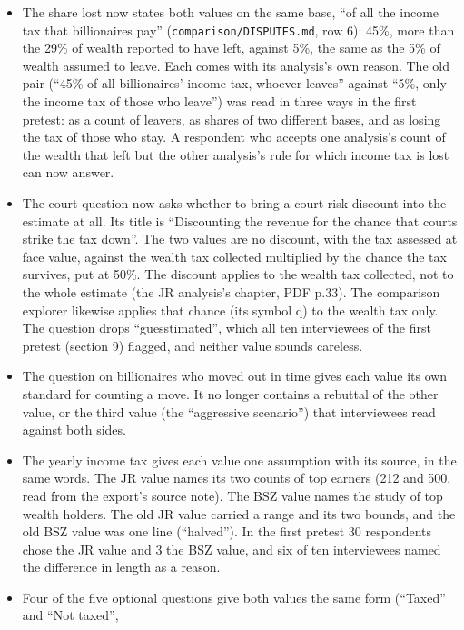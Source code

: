 \begin{itemize}
\tightlist
\item
  The share lost now states both values on the same base, ``of all the income tax that
  billionaires pay'' (\texttt{comparison/DISPUTES.md}, row 6): 45\%, more than the 29\% of wealth reported
  to have left, against 5\%, the same as the 5\% of wealth assumed to leave. Each comes with its
  analysis's own reason. The old pair (``45\% of
  all billionaires' income tax, whoever leaves'' against ``5\%, only the income tax of those who
  leave'') was read in three ways in the first pretest: as a count of leavers, as shares of two different
  bases, and as losing the tax of those who stay. A respondent who accepts one analysis's count
  of the wealth that left but the other analysis's rule for which income tax is lost can now
  answer.
\item
  The court question now asks whether to bring a court-risk discount into the estimate at all.
  Its title is ``Discounting the revenue for the chance that courts strike the tax down''. The two
  values are no discount, with the tax assessed at face value, against the wealth tax collected
  multiplied by the chance the tax survives, put at 50\%. The discount applies to the wealth tax
  collected, not to the whole estimate (the JR analysis's chapter, PDF p.33). The comparison
  explorer likewise applies that chance (its symbol q) to the wealth tax only. The question drops
  ``guesstimated'', which all ten interviewees of the first pretest (section 9) flagged, and neither
  value sounds careless.
\item
  The question on billionaires who moved out in time gives each value its own standard for
  counting a move. It no longer contains a rebuttal of the other value, or the third value (the
  ``aggressive scenario'') that interviewees read against both sides.
\item
  The yearly income tax gives each value one assumption with its source, in the same words. The
  JR value names its two counts of top earners (212 and 500, read from the export's source note).
  The BSZ value names the study of top wealth holders. The old JR value carried a range and its
  two bounds, and the old BSZ value was one line (``halved''). In the first pretest 30 respondents
  chose the JR value and 3 the BSZ value, and six of ten interviewees named the difference in
  length as a reason.
\item
  Four of the five optional questions give both values the same form (``Taxed'' and ``Not taxed'',

\end{itemize}

